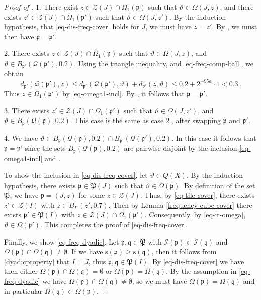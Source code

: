 \documentclass[10pt,a4paper]{article}
\theoremstyle{plain}
\theoremstyle{definition}
\numberwithin{equation}{subsection}
\newcommand{\fp}{{\mathfrak p}}
\newcommand{\fP}{{\mathfrak P}}
\newcommand{\fq}{{\mathfrak q}}
\newcommand{\ps}{{\mathrm{s}}}
\newcommand{\fc}{{\Omega}}
\newcommand{\scI}{{\mathcal{I}}} %
\newcommand{\tQ}{{Q}}
\newcommand{\mfa}{{\vartheta}}
\newcommand{\fcc}{{\mathcal{Q}}}
\begin{document}
\begin{proof}[Proof of ]
    1. There exist $z \in \mathcal{Z}(J) \cap \Omega_1(\fp)$ such that $\mfa \in \Omega(J, z)$, and there exists $z' \in \mathcal{Z}(J) \cap \Omega_1(\fp')$ such that $\mfa \in \Omega(J, z')$. By the induction hypothesis, that \eqref{eq-dis-freq-cover} holds for $J$, we must have $z = z'$. By , we must then have $\fp = \fp'$.

    2. There exists $z \in \mathcal{Z}(J) \cap \Omega_1(\fp)$ such that $\mfa \in \Omega(J,z)$, and $\mfa \in B_{\fp'}(\fcc(\fp'), 0.2)$. Using the triangle inequality,  and \eqref{eq-freq-comp-ball}, we obtain
    $$
        d_{\fp'}(\fcc(\fp'),z) \le d_{\fp'}(\fcc(\fp'), \mfa) + d_{\fp'}(z, \mfa) \le 0.2 + 2^{-95a} \cdot 1 < 0.3\,.
    $$
    Thus $z \in \Omega_1(\fp')$ by \eqref{eq-omega1-incl}. By , it follows that $\fp = \fp'$.

    3. There exists $z' \in \mathcal{Z}(J) \cap \Omega_1(\fp')$ such that $\mfa \in \Omega(J,z')$, and $\mfa \in B_{\fp}(\fcc(\fp), 0.2)$. This case is the same as case 2., after swapping $\fp$ and $\fp'$.

    4. We have $\mfa \in B_{\fp}(\fcc(\fp), 0.2) \cap B_{\fp'}(\fcc(\fp'), 0.2)$. In this case it follows that $\fp = \fp'$ since the sets $B_{\fp}(\fcc(\fp), 0.2)$ are pairwise disjoint by the inclusion \eqref{eq-omega1-incl} and .

    To show the inclusion in \eqref{eq-dis-freq-cover}, let $\mfa \in \tQ(X)$. By the induction hypothesis, there exists $\fp \in \fP(J)$ such that $\mfa \in \Omega(\fp)$. By definition of the set $\fP$, we have $\fp = (J, z)$ for some $z \in \mathcal{Z}(J)$.
    Thus, by \eqref{eq-tile-cover}, there exists $z' \in \mathcal{Z}(I)$ with $z \in B_{I^\circ}(z', 0.7)$. Then by Lemma \eqref{frequency-cube-cover} there exists $\fp' \in \fP(I)$ with $z \in \mathcal{Z}(J) \cap \Omega_1(\fp')$. Consequently, by \eqref{eq-it-omega}, $\mfa \in \fc(\fp')$. This completes the proof of \eqref{eq-dis-freq-cover}.

    Finally, we show \eqref{eq-freq-dyadic}. Let $\fp, \fq \in \fP$ with $\scI(\fp) \subset \scI(\fq)$ and $\fc(\fp) \cap \fc(\fq) \ne \emptyset$. If we have $\ps(\fp) \ge \ps(\fq)$, then it follows from \eqref{dyadicproperty} that $I = J$, thus $\fp, \fq \in \fP(I)$. By \eqref{eq-dis-freq-cover} we have then either $\fc(\fp) \cap \fc(\fq) = \emptyset$ or $\fc(\fp) = \fc(\fq)$. By the assumption in \eqref{eq-freq-dyadic} we have $\fc(\fp) \cap \fc(\fq) \ne \emptyset$, so we must have $\fc(\fp) = \fc(\fq)$ and in particular $\fc(\fq) \subset \fc(\fp)$.


\end{proof}
\end{document}
